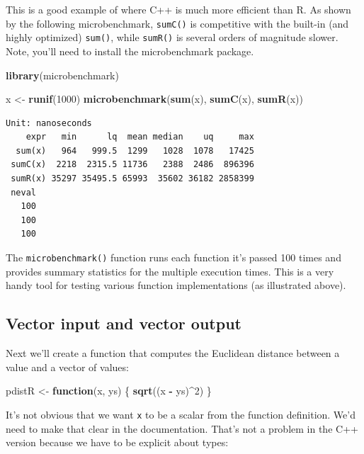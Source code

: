 \documentclass[]{krantz}
\makeatletter
\newenvironment{Shaded}{\begin{snugshade}}{\end{snugshade}}
\newcommand{\KeywordTok}[1]{\textcolor[rgb]{0.27,0.27,0.27}{\textbf{#1}}}
\newcommand{\DecValTok}[1]{\textcolor[rgb]{0.06,0.06,0.06}{#1}}
\newcommand{\StringTok}[1]{\textcolor[rgb]{0.5,0.5,0.5}{#1}}
\newcommand{\ControlFlowTok}[1]{\textcolor[rgb]{0.27,0.27,0.27}{\textbf{#1}}}
\newcommand{\OperatorTok}[1]{\textcolor[rgb]{0.43,0.43,0.43}{\textbf{#1}}}
\newcommand{\NormalTok}[1]{#1}
\newenvironment{kframe}{%
\medskip{}
\setlength{\fboxsep}{.8em}
 \def\at@end@of@kframe{}%
 \ifinner\ifhmode%
  \def\at@end@of@kframe{\end{minipage}}%
  \begin{minipage}{\columnwidth}%
 \fi\fi%
 \def\FrameCommand##1{\hskip\@totalleftmargin \hskip-\fboxsep
 \colorbox{shadecolor}{##1}\hskip-\fboxsep
     \hskip-\linewidth \hskip-\@totalleftmargin \hskip\columnwidth}%
 \MakeFramed {\advance\hsize-\width
   \@totalleftmargin\z@ \linewidth\hsize
   \@setminipage}}%
 {\par\unskip\endMakeFramed%
 \at@end@of@kframe}
\renewenvironment{Shaded}{\begin{kframe}}{\end{kframe}}
\makeatother
\begin{document}
This is a good example of where C++ is much more efficient than R. As
shown by the following microbenchmark, \texttt{sumC()} is competitive
with the built-in (and highly optimized) \texttt{sum()}, while
\texttt{sumR()} is several orders of magnitude slower. Note, you'll need
to install the microbenchmark package.

\begin{Shaded}
\begin{Highlighting}[]
\KeywordTok{library}\NormalTok{(microbenchmark)}

\NormalTok{x <-}\StringTok{ }\KeywordTok{runif}\NormalTok{(}\DecValTok{1000}\NormalTok{)}
\KeywordTok{microbenchmark}\NormalTok{(}\KeywordTok{sum}\NormalTok{(x), }\KeywordTok{sumC}\NormalTok{(x), }\KeywordTok{sumR}\NormalTok{(x))}
\end{Highlighting}
\end{Shaded}

\begin{verbatim}
Unit: nanoseconds
    expr   min      lq  mean median    uq     max
  sum(x)   964   999.5  1299   1028  1078   17425
 sumC(x)  2218  2315.5 11736   2388  2486  896396
 sumR(x) 35297 35495.5 65993  35602 36182 2858399
 neval
   100
   100
   100
\end{verbatim}

The \texttt{microbenchmark()} function runs each function it's passed
100 times and provides summary statistics for the multiple execution
times. This is a very handy tool for testing various function
implementations (as illustrated above).

\subsection{Vector input and vector
output}\label{vector-input-and-vector-output}

Next we'll create a function that computes the Euclidean distance
between a value and a vector of values:

\begin{Shaded}
\begin{Highlighting}[]
\NormalTok{pdistR <-}\StringTok{ }\ControlFlowTok{function}\NormalTok{(x, ys) \{}
    \KeywordTok{sqrt}\NormalTok{((x }\OperatorTok{-}\StringTok{ }\NormalTok{ys)}\OperatorTok{^}\DecValTok{2}\NormalTok{)}
\NormalTok{\}}
\end{Highlighting}
\end{Shaded}

It's not obvious that we want \texttt{x} to be a scalar from the
function definition. We'd need to make that clear in the documentation.
That's not a problem in the C++ version because we have to be explicit
about types:
\end{document}
